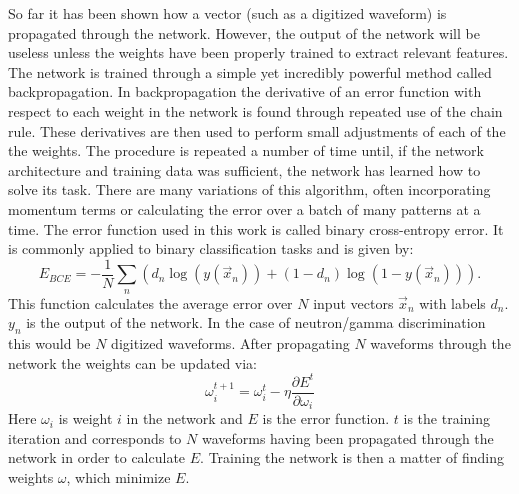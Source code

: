 \documentclass[main.tex]{subfiles}
\begin{document}
So far it has been shown how a vector (such as a digitized waveform) is propagated through the network. However, the output of the network will be useless unless the weights have been properly trained to extract relevant features. The network is trained through a simple yet incredibly powerful method called backpropagation. In backpropagation the derivative of an error function with respect to each weight in the network is found through repeated use of the chain rule. These derivatives are then used to perform small adjustments of each of the the weights. The procedure is repeated a number of time until, if the network architecture and training data was sufficient, the network has learned how to solve its task. There are many variations of this algorithm, often incorporating momentum terms or calculating the error over a batch of many patterns at a time.
The error function used in this work is called binary cross-entropy error. It is commonly applied to binary classification tasks and is given by:
\begin{equation}
	E_{BCE} = -\frac{1}{N}\sum_n\left(	d_n\log(y(\vec x_n))+(1-d_n)\log(1-y(\vec x_n))	\right).
\end{equation}
This function calculates the average error over $N$ input vectors $\vec x_n$ with labels $d_n$. $y_n$ is the output of the network. In the case of neutron/gamma discrimination this would be $N$ digitized waveforms. After propagating $N$ waveforms through the network the weights can be updated via:
\begin{equation}
	\omega^{t+1}_i = \omega^{t}_i - \eta\frac{\partial E^t}{\partial \omega_i}
\end{equation}
Here $\omega_i$ is weight $i$ in the network and $E$ is the error function. $t$ is the training iteration and corresponds to $N$ waveforms having been propagated through the network in order to calculate $E$. Training the network is then a matter of finding weights $\omega$, which minimize $E$.
\end{document}
